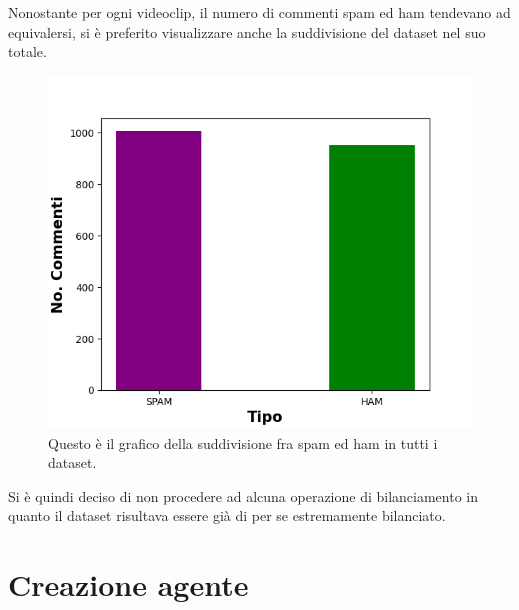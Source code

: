 \documentclass{report}
\begin{document}
   Nonostante per ogni videoclip, il numero di commenti spam ed ham tendevano ad equivalersi, si è preferito visualizzare
   anche la suddivisione del dataset nel suo totale.
    \newpage
    \begin{figure}[h!]
        \centering
        \includegraphics[height = 0.6\textwidth]{immagini/DatasetUnico.png}
        \caption{Questo è il grafico della suddivisione fra spam ed ham in tutti i dataset.}
    \end{figure}

    Si è quindi deciso di non procedere ad alcuna operazione di bilanciamento in quanto il dataset 
    risultava essere già di per se estremamente bilanciato.

    \chapter{Creazione agente}
\end{document}
